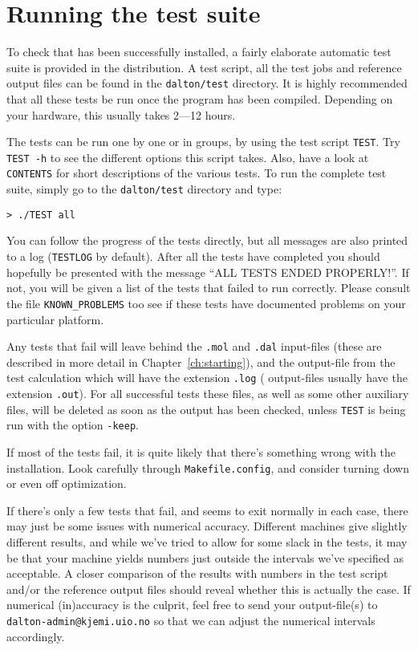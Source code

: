 \section{Running the {\dalton} test suite}\label{sec:testsuite}

To check that {\dalton} has been successfully installed, a fairly
elaborate automatic test suite is provided in the distribution. A test
script, all the test jobs and reference output files can be found in
the \verb|dalton/test| directory. It is highly recommended that all
these tests be run once the program has been compiled. Depending on
your hardware, this usually takes 2---12 hours.

The tests can be run one by one or in groups, by using the test script
\verb|TEST|. Try \verb|TEST -h| to see the different options this
script takes. Also, have a look at \verb|CONTENTS|
for short descriptions of the various tests. To run the
complete test suite, simply go to the \verb|dalton/test| directory and
type:
\begin{verbatim}
> ./TEST all
\end{verbatim}
You can follow the progress of the tests directly, but all messages
are also printed to a log (\verb|TESTLOG| by default). After all the
tests have completed you should hopefully be presented with the
message ``ALL TESTS ENDED PROPERLY!''. If not, you will be given a
list of the tests that failed to run correctly. Please consult the file
\verb|KNOWN_PROBLEMS| too see if these tests have documented problems
on your particular platform.

Any tests that fail will leave behind the \verb|.mol| and \verb|.dal|
input-files (these are described in more detail in
Chapter~\ref{ch:starting}), and the output-file from the test
calculation which will have the extension \verb|.log| ({\dalton}
output-files usually have the extension \verb|.out|). For all
successful tests these files, as well as some other auxiliary files,
will be deleted as soon as the output has been checked, unless
\verb|TEST| is being run with the option \verb|-keep|.

If most of the tests fail, it is quite likely that there's something
wrong with the installation. Look carefully through
\verb|Makefile.config|, and consider turning down or even off
optimization.

If there's only a few tests that fail, and {\dalton} seems to exit
normally in each case, there may just be some issues with numerical
accuracy. Different machines give slightly different results, and
while we've tried to allow for some slack in the tests, it may be
that your machine yields numbers just outside the intervals we've
specified as acceptable. A closer comparison of the results with
numbers in the test script and/or the reference output files should
reveal whether this is actually the case. If numerical (in)accuracy is
the culprit, feel free to send your output-file(s) to
\verb|dalton-admin@kjemi.uio.no| so that we can adjust the numerical
intervals accordingly.
